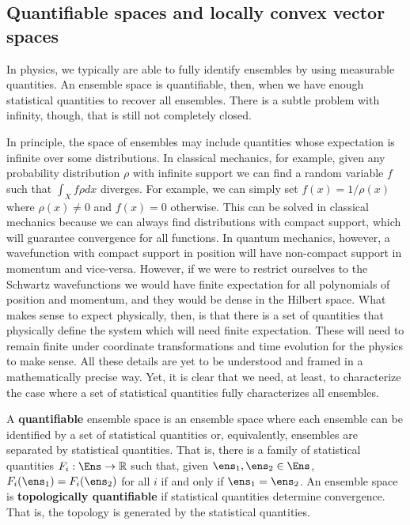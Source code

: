 \subsection{Quantifiable spaces and locally convex vector spaces}

In physics, we typically are able to fully identify ensembles by using measurable quantities. An ensemble space is quantifiable, then, when we have enough statistical quantities to recover all ensembles. There is a subtle problem with infinity, though, that is still not completely closed.

In principle, the space of ensembles may include quantities whose expectation is infinite over some distributions. In classical mechanics, for example, given any probability distribution $\rho$ with infinite support we can find a random variable $f$ such that $\int_X f \rho dx$ diverges. For example, we can simply set $f(x) = 1/\rho(x)$ where $\rho(x)\neq0$ and $f(x) = 0$ otherwise. This can be solved in classical mechanics because we can always find distributions with compact support, which will guarantee convergence for all functions. In quantum mechanics, however, a wavefunction with compact support in position will have non-compact support in momentum and vice-versa. However, if we were to restrict ourselves to the Schwartz wavefunctions we would have finite expectation for all polynomials of position and momentum, and they would be dense in the Hilbert space. What makes sense to expect physically, then, is that there is a set of quantities that physically define the system which will need finite expectation. These will need to remain finite under coordinate transformations and time evolution for the physics to make sense. All these details are yet to be understood and framed in a mathematically precise way. Yet, it is clear that we need, at least, to characterize the case where a set of statistical quantities fully characterizes all ensembles.

\begin{mathSection}
\begin{defn}
	A \textbf{quantifiable} ensemble space is an ensemble space where each ensemble can be identified by a set of statistical quantities or, equivalently, ensembles are separated by statistical quantities. That is, there is a family of statistical quantities $F_i : \Ens \to \mathbb{R}$ such that, given $\ens_1, \ens_2 \in \Ens$, $F_i(\ens_1) = F_i(\ens_2)$ for all $i$ if and only if $\ens_1 = \ens_2$. An ensemble space is \textbf{topologically quantifiable} if statistical quantities determine convergence. That is, the topology is generated by the statistical quantities.
\end{defn}
\end{mathSection}

